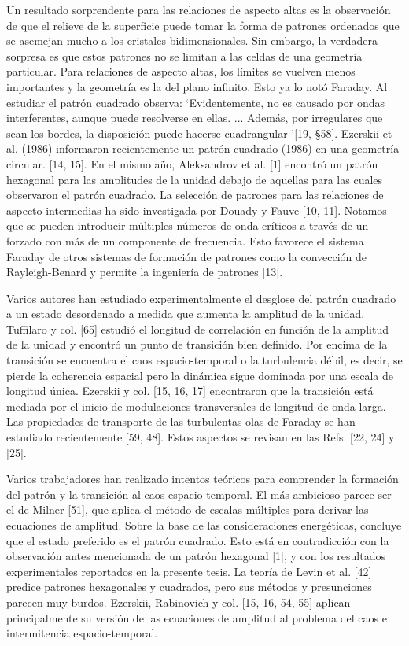Un resultado sorprendente para las relaciones de aspecto altas es la observación de que el relieve de la superficie puede tomar la forma de patrones ordenados que se asemejan mucho a los cristales bidimensionales. Sin embargo, la verdadera sorpresa es que estos patrones no se limitan a las celdas de una geometría particular. Para relaciones de aspecto altas, los límites se vuelven menos importantes y la geometría es la del plano infinito. Esto ya lo notó Faraday. Al estudiar el patrón cuadrado observa: `Evidentemente, no es causado por ondas interferentes, aunque puede resolverse en ellas. ... Además, por irregulares que sean los bordes, la disposición puede hacerse cuadrangular '[19, §58]. Ezerskii et al. (1986) informaron recientemente un patrón cuadrado (1986) en una geometría circular. [14, 15]. En el mismo año, Aleksandrov et al. [1] encontró un patrón hexagonal para las amplitudes de la unidad debajo de aquellas para las cuales observaron el patrón cuadrado. La selección de patrones para las relaciones de aspecto intermedias ha sido investigada por Douady y Fauve [10, 11]. Notamos que se pueden introducir múltiples números de onda críticos a través de un forzado con más de un componente de frecuencia. Esto favorece el sistema Faraday de otros sistemas de formación de patrones como la convección de Rayleigh-Benard y permite la ingeniería de patrones [13].

Varios autores han estudiado experimentalmente el desglose del patrón cuadrado a un estado desordenado a medida que aumenta la amplitud de la unidad. Tuffilaro y col. [65] estudió el longitud de correlación en función de la amplitud de la unidad y encontró un punto de transición bien definido. Por encima de la transición se encuentra el caos espacio-temporal o la turbulencia débil, es decir, se pierde la coherencia espacial pero la dinámica sigue dominada por una escala de longitud única. Ezerskii y col. [15, 16, 17] encontraron que la transición está mediada por el inicio de modulaciones transversales de longitud de onda larga. Las propiedades de transporte de las turbulentas olas de Faraday se han estudiado recientemente [59, 48]. Estos aspectos se revisan en las Refs. [22, 24] y [25].

Varios trabajadores han realizado intentos teóricos para comprender la formación del patrón y la transición al caos espacio-temporal. El más ambicioso parece ser el de Milner [51], que aplica el método de escalas múltiples para derivar las ecuaciones de amplitud. Sobre la base de las consideraciones energéticas, concluye que el estado preferido es el patrón cuadrado. Esto está en contradicción con la observación antes mencionada de un patrón hexagonal [1], y con los resultados experimentales reportados en la presente tesis. La teoría de Levin et al. [42] predice patrones hexagonales y cuadrados, pero sus métodos y presunciones parecen muy burdos. Ezerskii, Rabinovich y col. [15, 16, 54, 55] aplican principalmente su versión de las ecuaciones de amplitud al problema del caos e intermitencia espacio-temporal.

